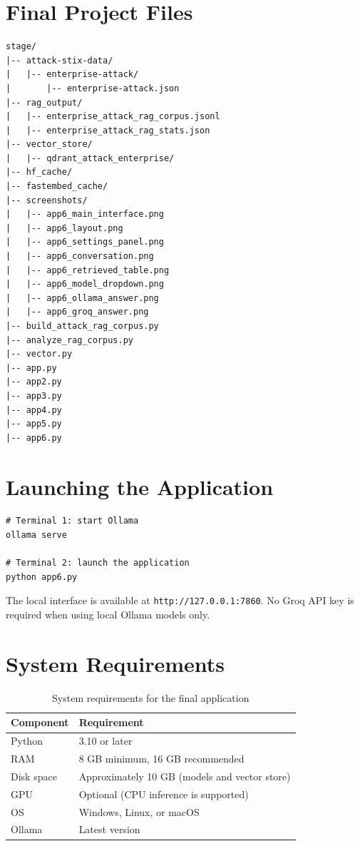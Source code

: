 \documentclass[12pt,a4paper]{report}
\begin{document}
\section{Final Project Files}

\begin{lstlisting}[style=bashstyle]
stage/
|-- attack-stix-data/
|   |-- enterprise-attack/
|       |-- enterprise-attack.json
|-- rag_output/
|   |-- enterprise_attack_rag_corpus.jsonl
|   |-- enterprise_attack_rag_stats.json
|-- vector_store/
|   |-- qdrant_attack_enterprise/
|-- hf_cache/
|-- fastembed_cache/
|-- screenshots/
|   |-- app6_main_interface.png
|   |-- app6_layout.png
|   |-- app6_settings_panel.png
|   |-- app6_conversation.png
|   |-- app6_retrieved_table.png
|   |-- app6_model_dropdown.png
|   |-- app6_ollama_answer.png
|   |-- app6_groq_answer.png
|-- build_attack_rag_corpus.py
|-- analyze_rag_corpus.py
|-- vector.py
|-- app.py
|-- app2.py
|-- app3.py
|-- app4.py
|-- app5.py
|-- app6.py
\end{lstlisting}

\section{Launching the Application}

\begin{lstlisting}[style=bashstyle]
# Terminal 1: start Ollama
ollama serve

# Terminal 2: launch the application
python app6.py
\end{lstlisting}

The local interface is available at \texttt{http://127.0.0.1:7860}. No Groq API key is required when using local Ollama models only.

\section{System Requirements}

\begin{table}[H]
\centering
\begin{tabular}{ll}
\toprule
\textbf{Component} & \textbf{Requirement} \\
\midrule
Python & 3.10 or later \\
RAM & 8 GB minimum, 16 GB recommended \\
Disk space & Approximately 10 GB (models and vector store) \\
GPU & Optional (CPU inference is supported) \\
OS & Windows, Linux, or macOS \\
Ollama & Latest version \\
\bottomrule
\end{tabular}
\caption{System requirements for the final application}
\end{table}
\end{document}

